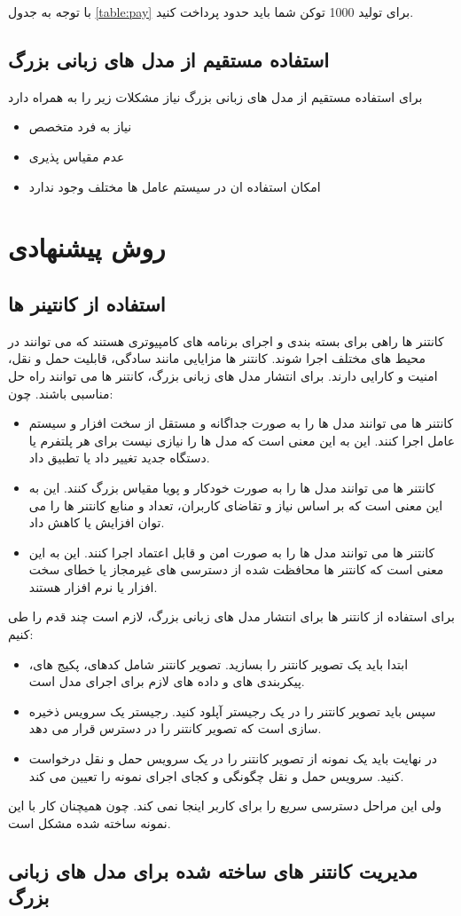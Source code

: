 با توجه به جدول \ref{table:pay} برای تولید 1000 توکن شما باید حدود  پرداخت کنید.

\subsection{استفاده مستقیم از مدل های زبانی بزرگ}
برای استفاده مستقیم از مدل های زبانی بزرگ نیاز مشکلات زیر را به همراه دارد
\begin{itemize}[label=-]
  \item
   نیاز به فرد متخصص
   \item
   عدم مقیاس پذیری
   \item
  امکان استفاده ان در سیستم عامل ها مختلف وجود ندارد
\end{itemize}

\section{روش پیشنهادی}
\subsection{استفاده از کانتینر ها}

کانتنر ها راهی برای بسته بندی و اجرای برنامه های کامپیوتری هستند که می توانند در محیط های مختلف اجرا شوند. کانتنر ها مزایایی مانند سادگی، قابلیت حمل و نقل، امنیت و کارایی دارند. برای انتشار مدل های زبانی بزرگ، کانتنر ها می توانند راه حل مناسبی باشند. چون:
\begin{itemize}[label=-]
  \item
   کانتنر ها می توانند مدل ها را به صورت جداگانه و مستقل از سخت افزار و سیستم عامل اجرا کنند. این به این معنی است که مدل ها را نیازی نیست برای هر پلتفرم یا دستگاه جدید تغییر داد یا تطبیق داد.
   \item
   کانتنر ها می توانند مدل ها را به صورت خودکار و پویا مقیاس بزرگ کنند. این به این معنی است که بر اساس نیاز و تقاضای کاربران، تعداد و منابع کانتنر ها را می توان افزایش یا کاهش داد.
   \item
   کانتنر ها می توانند مدل ها را به صورت امن و قابل اعتماد اجرا کنند. این به این معنی است که کانتنر ها محافظت شده از دسترسی های غیرمجاز یا خطای سخت افزار یا نرم افزار هستند.
\end{itemize}
برای استفاده از کانتنر ها برای انتشار مدل های زبانی بزرگ، لازم است چند قدم را طی کنیم:
\begin{itemize}[label=-]
  \item
   ابتدا باید یک تصویر  کانتنر را بسازید. تصویر کانتنر شامل کدهای، پکیج های، پیکربندی های و داده های لازم برای اجرای مدل است.
   \item
   سپس باید تصویر کانتنر را در یک رجیستر  آپلود کنید. رجیستر یک سرویس ذخیره سازی است که تصویر کانتنر را در دسترس قرار می دهد.
   \item
   در نهایت باید یک نمونه  از تصویر کانتنر را در یک سرویس حمل و نقل  درخواست کنید. سرویس حمل و نقل چگونگی و کجای اجرای نمونه را تعیین می کند.
\end{itemize}
ولی این مراحل دسترسی سریع را برای کاربر اینجا نمی کند. چون همیچنان کار با این نمونه ساخته شده مشکل است.

\subsection{مدیریت کانتنر های ساخته شده برای مدل های زبانی بزرگ}
